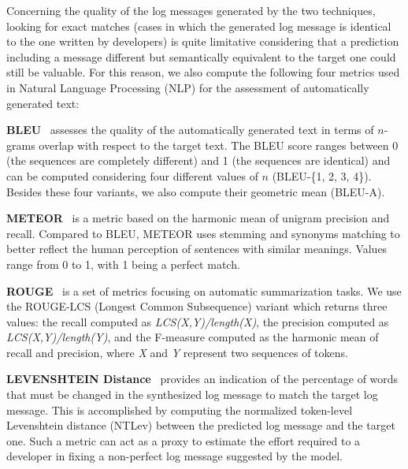 Concerning the quality of the log messages generated by the two techniques, looking for exact matches (\ie cases in which the generated log message is identical to the one written by developers) is quite limitative considering that a prediction including a message different but semantically equivalent to the target one could still be valuable. For this reason, we also compute the following four metrics used in Natural Language Processing (NLP) for the assessment of automatically generated text:

\textbf{BLEU}~\cite{papineni2002bleu} assesses the quality of the automatically generated text in terms of $n$-grams overlap with respect to the target text. The BLEU score ranges between 0 (the sequences are completely different) and 1 (the sequences are identical) and can be computed considering four different values of $n$ (\ie BLEU-\{1, 2, 3, 4\}). Besides these four variants, we also compute their geometric mean (\ie BLEU-A).

\textbf{METEOR}~\cite{meteor} is a metric based on the harmonic mean of unigram precision and recall. Compared to BLEU, METEOR uses stemming and synonyms matching to better reflect the human perception of sentences with similar meanings. Values range from 0 to 1, with 1 being a perfect match.

\textbf{ROUGE}~\cite{lin2004rouge} is a set of metrics focusing on automatic summarization tasks. We use the ROUGE-LCS (Longest Common Subsequence) variant which returns three values: the recall computed as \textit{LCS(X,Y)/length(X)}, the precision computed as \textit{LCS(X,Y)/length(Y)}, and the F-measure computed as the harmonic mean of recall and precision, where \textit{X} and \textit{Y} represent two sequences of tokens.

\textbf{LEVENSHTEIN Distance}~\cite{levenshtein1966} provides an indication of the percentage of words that must be changed in the synthesized log message to match the target log message. This is accomplished by computing the normalized token-level Levenshtein distance \cite{levenshtein1966} (NTLev) between the predicted log message and the target one. Such a metric can act as a proxy to estimate the effort required to a developer in fixing a non-perfect log message suggested by the model.

%



